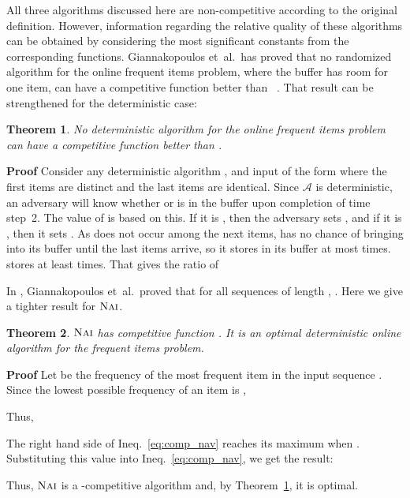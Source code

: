 \documentclass[11pt]{article}
\newtheorem{xtheorem}{Theorem}
\newenvironment{theorem}{\begin{xtheorem}\rm}{\end{xtheorem}}
\newenvironment{proof}{\begin{trivlist}\item[]{\bf Proof }}{\hspace*{\fill}\raisebox{-1pt}{\boldmath}\end{trivlist}}
\newcommand{\nav}{{\ensuremath{\textsc{Nai}}}\xspace}
\newcommand{\algA}{{\ensuremath{\mathcal{A}}}\xspace}
\begin{document}
All three algorithms discussed here are non-competitive according to
the original definition.
However, information regarding the relative quality of these algorithms
can be obtained by considering the most significant constants
from the corresponding functions.
Giannakopoulos et~al.\ has proved that no randomized algorithm for the
online frequent items problem, where the buffer has room for one item,
can have a competitive function better than
~\cite{Giannakopoulos12}.
That result can be strengthened for the deterministic case:
\begin{theorem}\label{thm:comp_all}
No deterministic algorithm for the online frequent items problem can have a competitive function better than .
\end{theorem}
\begin{proof}
Consider any deterministic algorithm , and input of the form
 where the
first  items are distinct and the last 
items are identical.
Since \algA is deterministic, an adversary will know whether 
or  is in the buffer upon completion of time step~2.
The value of  is based on this.
If it is , then the adversary sets , and if it is , then
it sets .
As  does not occur among the next  items,
 has no chance of bringing  into its buffer until
the last  items arrive, so it
stores  in its buffer at most  times.
 stores  at least  times.
That gives the ratio of

\end{proof}

In \cite{Giannakopoulos12}, Giannakopoulos et~al.\ proved that
for all sequences  of length , .
Here we give a tighter result for \nav.
\begin{theorem}\label{thm:comp_nav}
\nav has competitive function . It is an 
optimal deterministic online algorithm for the frequent items problem.
\end{theorem}
\begin{proof}
Let  be the frequency of the most frequent item in the input sequence .
Since the lowest possible frequency of an item is ,

Thus,

The right hand side of Ineq.~\ref{eq:comp_nav} reaches its maximum when .
Substituting this value into Ineq.~\ref{eq:comp_nav}, we get the result:

Thus, \nav is a -competitive algorithm and,
by Theorem~\ref{thm:comp_all}, it is optimal.

\end{proof}
\end{document}
